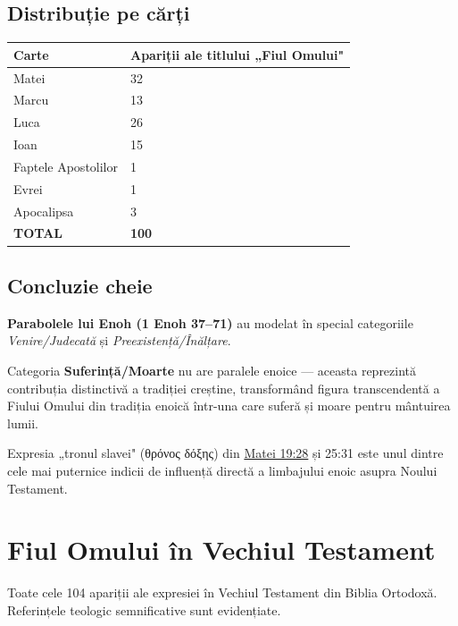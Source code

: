 \documentclass[12pt,a4paper,twoside,openany]{book}
\begin{document}
\section{Distribuție pe cărți}
\small
\begin{longtable}{L{5.3cm}L{9.8cm}}
\toprule
{}
\textbf{Carte} & \textbf{Apariții ale titlului „Fiul Omului"} \\
\midrule
\endhead
Matei & 32 \\
Marcu & 13 \\
Luca & 26 \\
Ioan & 15 \\
Faptele Apostolilor & 1 \\
Evrei & 1 \\
Apocalipsa & 3 \\
\textbf{TOTAL} & \textbf{100} \\
\bottomrule
\end{longtable}
\normalsize

\section{Concluzie cheie}
\textbf{Parabolele lui Enoh (1 Enoh 37–71)} au modelat în special categoriile \textit{Venire/Judecată} și \textit{Preexistență/Înălțare}.

Categoria \textbf{Suferință/Moarte} nu are paralele enoice — aceasta reprezintă contribuția distinctivă a tradiției creștine,
transformând figura transcendentă a Fiului Omului din tradiția enoică într-una care suferă și moare pentru mântuirea lumii.

Expresia „tronul slavei" (θρόνος δόξης) din \href{https://bibliaortodoxa.ro/carte.php?id=55\&cap=19\#28}{Matei 19:28} și 25:31 este unul dintre cele mai puternice indicii de influență directă a limbajului enoic asupra Noului Testament.


\chapter{Fiul Omului în Vechiul Testament}\label{vt}
Toate cele 104 apariții ale expresiei în Vechiul Testament din Biblia Ortodoxă.
Referințele teologic semnificative sunt evidențiate.
\end{document}
